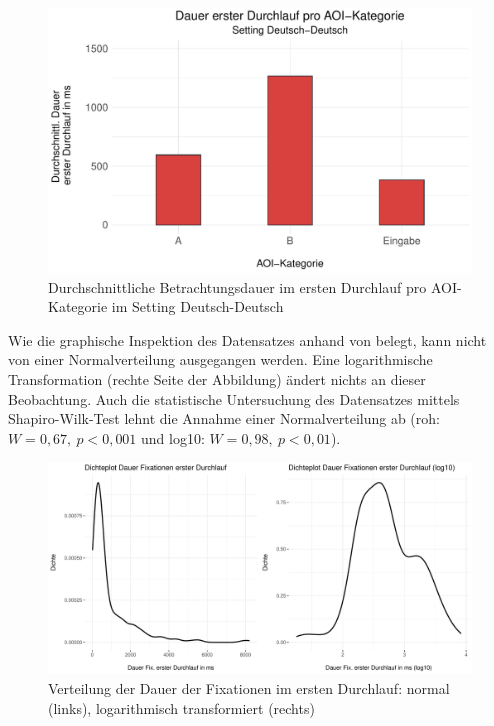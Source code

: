 \begin{figure}
    \includegraphics[width=\textwidth]{Figures/EyeTracking/DD/ggplot_DD_meanfrundwell_AOI_de}
	\caption{Durchschnittliche Betrachtungsdauer im ersten Durchlauf pro AOI-Kategorie im Setting Deutsch-Deutsch}
	\label{K6:fig:DeDe:mean-error-FRDwell}
\end{figure}


Wie die graphische Inspektion des Datensatzes anhand von  belegt, kann nicht von einer Normalverteilung ausgegangen werden. Eine logarithmische Transformation (rechte Seite der Abbildung) ändert nichts an dieser Beobachtung. Auch die statistische Untersuchung des Datensatzes mittels Shapiro-Wilk-Test lehnt die Annahme einer Normalverteilung ab (roh: $W = 0,67,\allowbreak\ p < 0,001$ und log10: $W = 0,98,\allowbreak\ p < 0,01$).


\begin{figure}
    \includegraphics[width=\textwidth]{Figures/EyeTracking/DD/ggplot_DD-IAFRunD_density_de}
	\caption[Verteilung der Dauer der Fixationen im ersten Durchlauf]{Verteilung der Dauer der Fixationen im ersten Durchlauf: normal (links), logarithmisch transformiert (rechts)}
	\label{K6:fig:DD:density-IAFRunD}
\end{figure}


